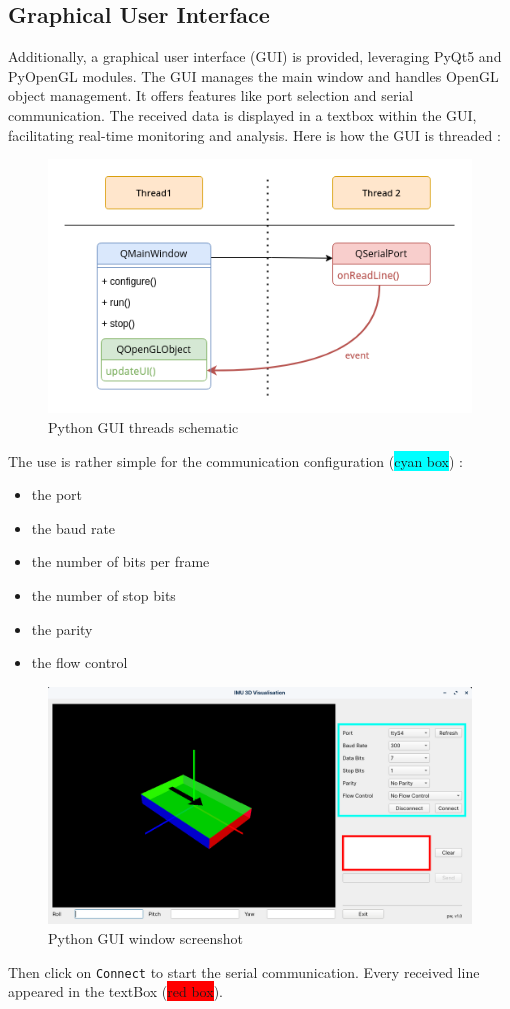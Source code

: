 \subsection{Graphical User Interface}
Additionally, a graphical user interface (GUI) is provided, leveraging PyQt5 and PyOpenGL modules. The GUI manages the main window and handles OpenGL object management. It offers features like port selection and serial communication. The received data is displayed in a textbox within the GUI, facilitating real-time monitoring and analysis.
Here is how the GUI is threaded :
\begin{figure}[H]
    \centering
    \includegraphics[width=0.65\linewidth]{./projects/pmodnav/gui_threads.png}
    \caption{Python GUI threads schematic}
\end{figure}
The use is rather simple for the communication configuration (\colorbox{cyan}{cyan box}) :
\begin{itemize}
    \item the port
    \item the baud rate
    \item the number of bits per frame
    \item the number of stop bits
    \item the parity
    \item the flow control
\end{itemize}
\begin{figure}[H]
    \centering
    \includegraphics[width=0.65\linewidth]{./projects/pmodnav/gui_window.png}
    \caption{Python GUI window screenshot}
\end{figure}
Then click on \texttt{Connect} to start the serial communication. Every received line appeared in the textBox (\colorbox{red}{red box}).


